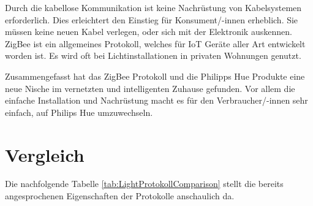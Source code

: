 Durch die kabellose Kommunikation ist keine Nachrüstung von Kabelsystemen erforderlich. Dies erleichtert den Einstieg für Konsument/-innen erheblich. Sie müssen keine neuen Kabel verlegen, oder sich mit der Elektronik auskennen. ZigBee ist ein allgemeines Protokoll, welches für IoT Geräte aller Art entwickelt worden ist. Es wird oft bei Lichtinstallationen in privaten Wohnungen genutzt.

Zusammengefasst hat das ZigBee Protokoll und die Philipps Hue Produkte eine neue Nische im vernetzten und intelligenten Zuhause gefunden. Vor allem die einfache Installation und Nachrüstung macht es für den Verbraucher/-innen sehr einfach, auf Philips Hue umzuwechseln.

\section{Vergleich}

Die nachfolgende Tabelle \ref{tab:LightProtokollComparison} stellt die bereits angesprochenen Eigenschaften der Protokolle anschaulich da.

\begin{table}[H]
	\centering
	\caption{Lichtsteuer Protokolle im Vergleich}
	\label{tab:LightProtokollComparison}
\end{table}
